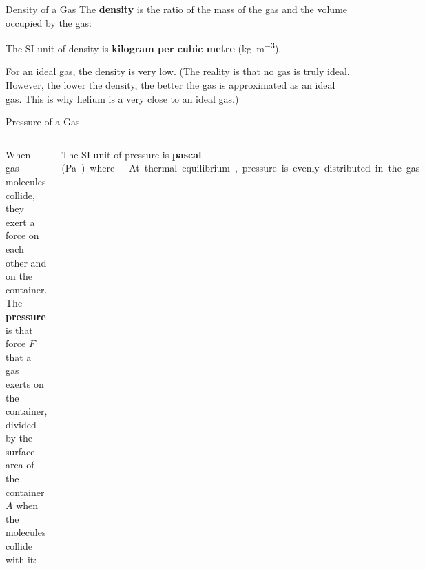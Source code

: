 \documentclass[12pt,aspectratio=169,dvipsnames]{beamer}
\begin{document}
\begin{frame}{Density of a Gas}
  The \textbf{density} is the ratio of the mass of the gas and the volume
  occupied by the gas:


  The SI unit of density is \textbf{kilogram per cubic metre}
  (\si{\kilo\gram\per\metre\cubed}).
  \begin{center}
  \end{center}
  For an ideal gas, the density is very low. (The reality is that no gas is
  truly ideal. However, the lower the density, the better the gas is
  approximated as an ideal gas. This is why helium is a very close to an
  ideal gas.)
\end{frame}



\begin{frame}{Pressure of a Gas}
  \begin{columns}
    When gas molecules collide, they exert a force on each other and on the
    container. The \textbf{pressure} is that force $F$ that a gas exerts on the
    container, divided by the surface area of the container $A$ when the
    molecules collide with it:


    The SI unit of pressure is  \textbf{pascal} (\si\pascal) where


    \vspace{-.2in}At thermal equilibrium, pressure is evenly distributed in the
    gas

    \centering
  \end{columns}
\end{frame}
\end{document}
